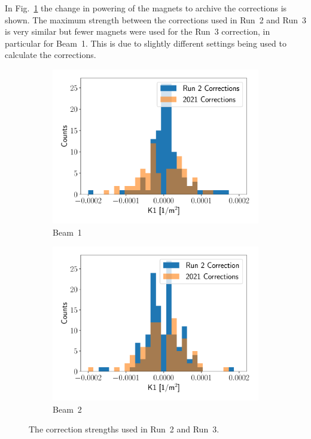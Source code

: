 \documentclass[a4paper]{cernatsnote}
\begin{document}
In Fig.~\ref{fig:corrector_strength_injection} the change in powering of the magnets to archive the corrections is shown. The maximum strength between the corrections used in Run~2 and Run~3 is very similar but fewer magnets were used for the Run~3 correction, in particular for Beam~1. This is due to slightly different settings being used to calculate the corrections.  

\begin{figure}[ht]
\begin{subfigure}{.5\textwidth}
  \centering
  \includegraphics[width=.9\linewidth]{beam1_corrections.pdf}  
  \caption{Beam~1}
\end{subfigure}
\begin{subfigure}{.5\textwidth}
  \centering
  \includegraphics[width=.9\linewidth]{beam2_corrections.pdf}  
  \caption{Beam~2}
\end{subfigure}
\caption{The correction strengths used in Run~2 and Run~3.}
\label{fig:corrector_strength_injection}
\end{figure}
\end{document}
